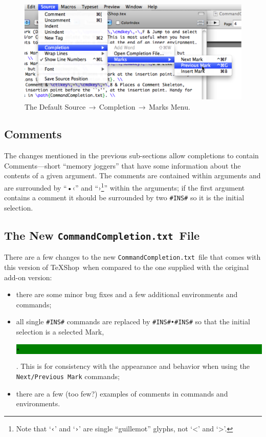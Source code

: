 \documentclass[11pt]{article}
\newcommand{\mnu}[1]{\textsf{#1}}
\newcommand{\To}{\,\(\to\)\,}
\newcommand{\selmark}{\colorbox{green}{\rule[-0.5ex]{0ex}{2.1ex}\texttt{•}}}
\newcommand{\TS}{\textsf{\TeX Shop}}
\newcommand{\CCT}{\texttt{CommandCompletion.txt}}
\begin{document}
\begin{figure}
\centering\includegraphics[width=\textwidth]{figs/DefaultMarksMenu}
\caption{The Default \mnu{Source}\To\mnu{Completion}\To\mnu{Marks} Menu.}
\label{fig:marks}
\end{figure}

\subsection*{Comments}

The changes mentioned in the previous sub-sections allow completions to contain Comments---short ``memory joggers'' that have some information about the contents of a given argument. The comments are contained within arguments and are surrounded by ``•‹'' and ``›\footnote{Note that `\texttt{‹}' and `\texttt{›}' are single ``guillemot'' glyphs, not `<' and `>'.}'' within the arguments; if the first argument contains a comment it should be surrounded by two \verb|#INS#| so it is the initial selection.

\subsection*{The New \CCT\ File}

There are a few changes to the new \CCT\ file that comes with this version of \TS\ when compared to the one supplied with the original add-on version:
\begin{itemize}
\item
there are some minor bug fixes and a few additional environments and commands;
\item
all single \verb|#INS#| commands are replaced by \verb|#INS#•#INS#| so that the initial selection is a selected Mark, \selmark. This is for consistency with the appearance and behavior when using the \texttt{Next/Previous Mark} commands;
\item
there are a few (too few?) examples of comments in commands and environments.
\end{itemize}
\end{document}
